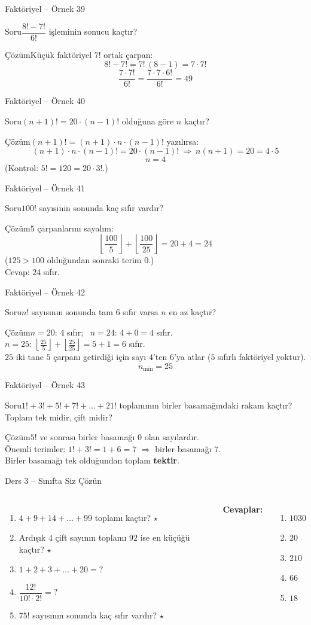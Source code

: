 \documentclass[aspectratio=169,11pt]{beamer}
\newcommand{\soru}[3]{%
\begin{frame}{#1}
  \begin{block}{Soru}\large #2\end{block}
  \pause
  \begin{exampleblock}{Çözüm}\large #3\end{exampleblock}
\end{frame}}
\begin{document}
\soru{Faktöriyel -- Örnek 39}
{\(\dfrac{8!-7!}{6!}\) işleminin sonucu kaçtır?}
{Küçük faktöriyel \(7!\) ortak çarpan:
\[8!-7!=7!\,(8-1)=7\cdot 7!\]
\[\frac{7\cdot 7!}{6!}=\frac{7\cdot 7\cdot 6!}{6!}=49\]}

\soru{Faktöriyel -- Örnek 40}
{\((n+1)!=20\cdot(n-1)!\) olduğuna göre \(n\) kaçtır?}
{\((n+1)!=(n+1)\cdot n\cdot(n-1)!\) yazılırsa:
\[(n+1)\cdot n\cdot(n-1)!=20\cdot(n-1)!\ \Rightarrow\ n(n+1)=20=4\cdot 5\]
\[n=4\]
(Kontrol: \(5!=120=20\cdot 3!\).)}

\soru{Faktöriyel -- Örnek 41}
{\(100!\) sayısının sonunda kaç sıfır vardır?}
{\(5\) çarpanlarını sayalım:
\[\left\lfloor\frac{100}{5}\right\rfloor+\left\lfloor\frac{100}{25}\right\rfloor=20+4=24\]
(\(125>100\) olduğundan sonraki terim \(0\).)\\[3pt]
Cevap: \(24\) sıfır.}

\soru{Faktöriyel -- Örnek 42}
{\(n!\) sayısının sonunda tam \(6\) sıfır varsa \(n\) en az kaçtır?}
{\(n=20\): \(4\) sıfır; \ \(n=24\): \(4+0=4\) sıfır.\\[3pt]
\(n=25\): \(\left\lfloor\frac{25}{5}\right\rfloor+\left\lfloor\frac{25}{25}\right\rfloor=5+1=6\) sıfır.\\[3pt]
\(25\) iki tane \(5\) çarpanı getirdiği için sayı \(4\)'ten \(6\)'ya atlar (\(5\) sıfırlı faktöriyel yoktur).
\[n_{\min}=25\]}

\soru{Faktöriyel -- Örnek 43}
{\(1!+3!+5!+7!+\dots+21!\) toplamının birler basamağındaki rakam kaçtır? Toplam tek midir, çift midir?}
{\(5!\) ve sonrası birler basamağı \(0\) olan sayılardır.\\[3pt]
Önemli terimler: \(1!+3!=1+6=7\) \(\Rightarrow\) birler basamağı \(7\).\\[3pt]
Birler basamağı tek olduğundan toplam \textbf{tektir}.}

\begin{frame}{Ders 3 -- Sınıfta Siz Çözün}
\begin{columns}[t]
\begin{enumerate}
\item \(4+9+14+\dots+99\) toplamı kaçtır? \(\star\)
\item Ardışık \(4\) çift sayının toplamı \(92\) ise en küçüğü kaçtır? \(\star\)
\item \(1+2+3+\dots+20=?\)
\item \(\dfrac{12!}{10!\cdot 2!}=?\)
\item \(75!\) sayısının sonunda kaç sıfır vardır? \(\star\)
\end{enumerate}
\pause
\textbf{Cevaplar:}
\begin{enumerate}
\item \(1030\)
\item \(20\)
\item \(210\)
\item \(66\)
\item \(18\)
\end{enumerate}
\end{columns}
\vspace{4pt}{\footnotesize \(\star\) işaretli soruların adım adım çözümü sonraki slaytlardadır.}
\end{frame}
\end{document}
